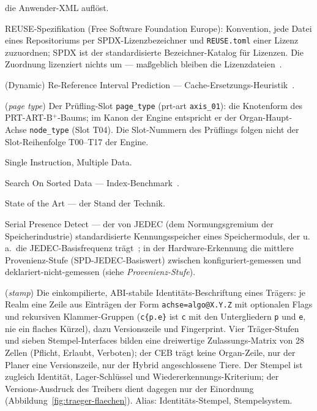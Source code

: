 \begin{description}
  die Anwender-XML auflöst.
  \item[REUSE, SPDX] REUSE-Spezifikation (Free Software Foundation Europe): Konvention, jede Datei
  eines Repositoriums per SPDX-Lizenzbezeichner und \texttt{REUSE.toml} einer Lizenz zuzuordnen;
  SPDX ist der standardisierte Bezeichner-Katalog für Lizenzen. Die Zuordnung lizenziert nichts um
  --- maßgeblich bleiben die Lizenzdateien~\cite{fsfe2024reuse}.
  \item[RRIP, DRRIP] (Dynamic) Re-Reference Interval Prediction ---
  Cache-Ersetzungs-Heuristik~\cite{jaleel2010rrip}.
  \item[Seitentyp] (\emph{page type}) Der Prüfling-Slot \texttt{page\_type} (prt-art
  \texttt{axis\_01}): die Knotenform des PRT-ART-B$^+$-Baums; im Kanon der Engine entspricht er der
  Organ-Haupt-Achse \texttt{node\_type} (Slot T04). Die Slot-Nummern des Prüflings folgen nicht der
  Slot-Reihenfolge T00--T17 der Engine.
  \item[SIMD] Single Instruction, Multiple Data.
  \item[SOSD] Search On Sorted Data --- Index-Benchmark~\cite{kipf2019sosd}.
  \item[SOTA] State of the Art --- der Stand der Technik.
  \item[SPD, JEDEC] Serial Presence Detect --- der von JEDEC (dem Normungsgremium der
  Speicherindustrie) standardisierte Kennungsspeicher eines Speichermoduls, der u.\,a.\ die
  JEDEC-Basisfrequenz trägt~\cite{jedec_jesd400_5}; in der Hardware-Erkennung die mittlere
  Provenienz-Stufe (SPD-JEDEC-Basiswert) zwischen konfiguriert-gemessen und
  deklariert-nicht-gemessen (siehe \emph{Provenienz-Stufe}).
  \item[Stempel] (\emph{stamp}) Die einkompilierte, ABI-stabile Identitäts-Beschriftung eines
  Trägers: je Realm eine Zeile aus Einträgen der Form \texttt{achse=algo@X.Y.Z} mit optionalen
  Flags und rekursiven Klammer-Gruppen (\texttt{c\{p.e\}} ist \texttt{c} mit den Untergliedern
  \texttt{p} und \texttt{e}, nie ein flaches Kürzel), dazu Versionszeile und Fingerprint. Vier
  Träger-Stufen und sieben Stempel-Interfaces bilden eine dreiwertige Zulassungs-Matrix von 28
  Zellen (Pflicht, Erlaubt, Verboten); der CEB trägt keine Organ-Zeile, nur der Planer eine
  Versionszeile, nur der Hybrid angeschlossene Tiere. Der Stempel ist zugleich Identität,
  Lager-Schlüssel und Wiedererkennungs-Kriterium; der Versions-Ausdruck des Treibers dient dagegen
  nur der Einordnung (Abbildung~\ref{fig:traeger-flaechen}). Alias: Identitäts-Stempel,
  Stempelsystem.

\end{description}
